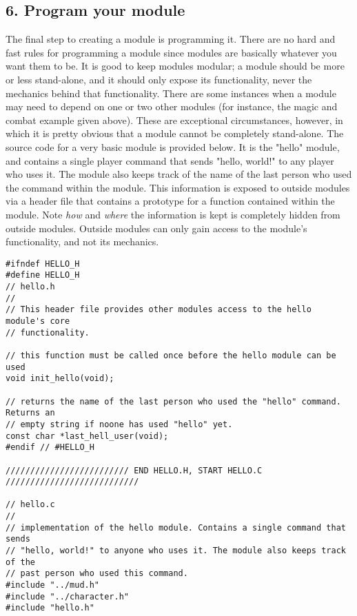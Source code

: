 \documentclass[fignum,doc]{article}
\begin{document}
\begin{doublespace}
\subsection{6. Program your module}
The final step to creating a module is programming it. There are no hard and fast rules for programming a module since modules are basically whatever you want them to be. It is good to keep modules modular; a module should be more or less stand-alone, and it should only expose its functionality, never the mechanics behind that functionality. There are some instances when a module may need to depend on one or two other modules (for instance, the magic and combat example given above). These are exceptional circumstances, however, in which it is pretty obvious that a module cannot be completely stand-alone. The source code for a very basic module is provided below. It is the "hello" module, and contains a single player command that sends "hello, world!" to any player who uses it. The module also keeps track of the name of the last person who used the command within the module. This information is exposed to outside modules via a header file that contains a prototype for a function contained within the module. Note {\it how} and {\it where} the information is kept is completely hidden from outside modules. Outside modules can only gain access to the module's functionality, and not its mechanics.

\begin{singlespace} \begin{verbatim}
#ifndef HELLO_H
#define HELLO_H
// hello.h
//
// This header file provides other modules access to the hello module's core
// functionality.

// this function must be called once before the hello module can be used
void init_hello(void);

// returns the name of the last person who used the "hello" command. Returns an
// empty string if noone has used "hello" yet.
const char *last_hell_user(void);
#endif // #HELLO_H

///////////////////////// END HELLO.H, START HELLO.C ///////////////////////////

// hello.c
//
// implementation of the hello module. Contains a single command that sends
// "hello, world!" to anyone who uses it. The module also keeps track of the
// past person who used this command.
#include "../mud.h"
#include "../character.h"
#include "hello.h"




\end{verbatim}
\end{singlespace}
\end{doublespace}
\end{document}
